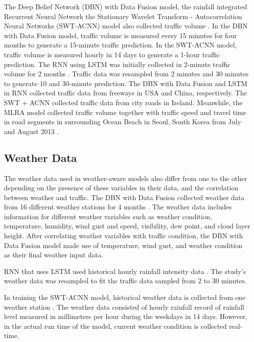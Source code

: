 The Deep Belief Network (DBN) with Data Fusion model, the rainfall integrated Recurrent Neural Network the Stationary Wavelet Transform - Autocorrelation Neural Networks (SWT-ACNN) model also collected traffic volume . In the DBN with Data Fusion model, traffic volume is measured every 15 minutes for four months to generate a 15-minute traffic prediction. In the SWT-ACNN model, traffic volume is measured hourly in 14 days to generate a 1-hour traffic prediction. The RNN using LSTM was initially collected in 2-minute traffic volume for 2 months . Traffic data was resampled from 2 minutes and 30 minutes to generate 10 and 30-minute prediction. The DBN with Data Fusion and LSTM in RNN collected traffic data from freeways in USA and China, respectively. The SWT + ACNN collected traffic data from city roads in Ireland. Meanwhile, the MLRA model collected traffic volume together with traffic speed and travel time in road segments in surrounding Ocean Beach in Seoul, South Korea from July and August 2013 . 

\subsection{Weather Data}
The weather data used in weather-aware models also differ from one to the other depending on the presence of these variables in their data, and the correlation between weather and traffic. The DBN with Data Fusion collected weather data from 16 different weather stations for 4 months . The weather data includes information for different weather variables such as weather condition, temperature, humidity, wind gust and speed, visibility, dew point, and cloud layer height. After correlating weather variables with traffic condition, the DBN with Data Fusion model made use of temperature, wind gust, and weather condition as their final weather input data.

RNN that uses LSTM used historical hourly rainfall intensity data . The study's weather data was resampled to fit the traffic data sampled from 2 to 30 minutes. 

In training the SWT-ACNN model, historical weather data is collected from one weather station . The weather data consisted of hourly rainfall record of rainfall level measured in millimeters per hour during the weekdays in 14 days. However, in the actual run time of the model, current weather condition is collected real-time.

